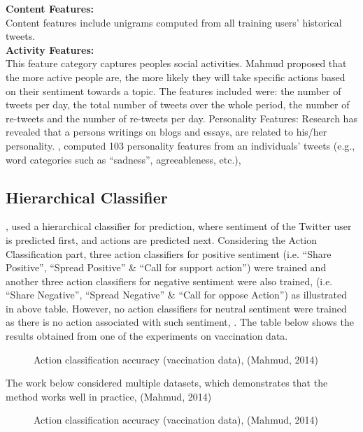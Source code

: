 \textbf{Content Features:} \\
Content features include unigrams computed from all training users' historical tweets.\\
\textbf{Activity Features:}\\
This feature category captures people\textquotesingle s social activities. Mahmud proposed that the more active people are, the more likely they will take specific actions based on their sentiment
towards a topic. The features included were: the number of tweets per day, the total number of tweets over the whole period, the number of re-tweets and the number of re-tweets per day. Personality Features: Research has revealed that a persons writings on blogs and essays, are related to his/her personality. \cite{ref38}, computed 103 personality features from an individuals' tweets (e.g., word categories such as “sadness”, agreeableness, etc.),
\leavevmode\\

\subsection{Hierarchical Classifier}
\cite{ref38}, used a hierarchical classifier for prediction, where sentiment of the Twitter user
is predicted first, and actions are predicted next. Considering the Action Classification part, three
action classifiers for positive sentiment (i.e. “Share Positive”, “Spread Positive” \& “Call for
support action”) were trained and another three action classifiers for negative sentiment were also
trained, (i.e. “Share Negative”, “Spread Negative” \& “Call for oppose Action”) as illustrated in
above table. However, no action classifiers for neutral sentiment were trained as there is no action
associated with such sentiment, \cite{ref38}. The table below shows the results obtained from
one of the experiments on vaccination data.


\begin{figure}[h]
  \centering
  \caption[Action classification]%
  {Action classification accuracy (vaccination data), (Mahmud, 2014)}
  \label{fig:ALAP:sm1}
\end{figure}


The work below considered multiple datasets, which demonstrates that the method works well in
practice, (Mahmud, 2014)

\begin{figure}[h]
  \centering
  \caption[Action classification multiple data sets]%
  {Action classification accuracy (vaccination data), (Mahmud, 2014)}
  \label{fig:ALAP:sm1}
\end{figure}



